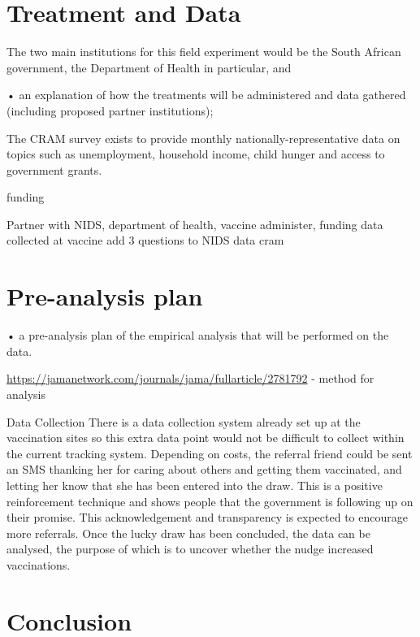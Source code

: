 \documentclass[11pt,preprint, authoryear]{elsarticle}
\numberwithin{equation}{section}
\numberwithin{figure}{section}
\numberwithin{table}{section}
\begin{document}
\hypertarget{treatment-and-data}{%
\section{\texorpdfstring{Treatment and Data
\label{treatment}}{Treatment and Data }}\label{treatment-and-data}}

The two main institutions for this field experiment would be the South
African government, the Department of Health in particular, and

• an explanation of how the treatments will be administered and data
gathered (including proposed partner institutions);

The CRAM survey exists to provide monthly nationally-representative data
on topics such as unemployment, household income, child hunger and
access to government grants.

funding

Partner with NIDS, department of health, vaccine administer, funding
data collected at vaccine add 3 questions to NIDS data cram

\hypertarget{pre-analysis-plan}{%
\section{\texorpdfstring{Pre-analysis plan
\label{pre}}{Pre-analysis plan }}\label{pre-analysis-plan}}

• a pre-analysis plan of the empirical analysis that will be performed
on the data.

\url{https://jamanetwork.com/journals/jama/fullarticle/2781792} - method
for analysis

Data Collection There is a data collection system already set up at the
vaccination sites so this extra data point would not be difficult to
collect within the current tracking system. Depending on costs, the
referral friend could be sent an SMS thanking her for caring about
others and getting them vaccinated, and letting her know that she has
been entered into the draw. This is a positive reinforcement technique
and shows people that the government is following up on their promise.
This acknowledgement and transparency is expected to encourage more
referrals. Once the lucky draw has been concluded, the data can be
analysed, the purpose of which is to uncover whether the nudge increased
vaccinations.

\hfill

\hypertarget{conclusion}{%
\section{\texorpdfstring{Conclusion
\label{con}}{Conclusion }}\label{conclusion}}
\end{document}

